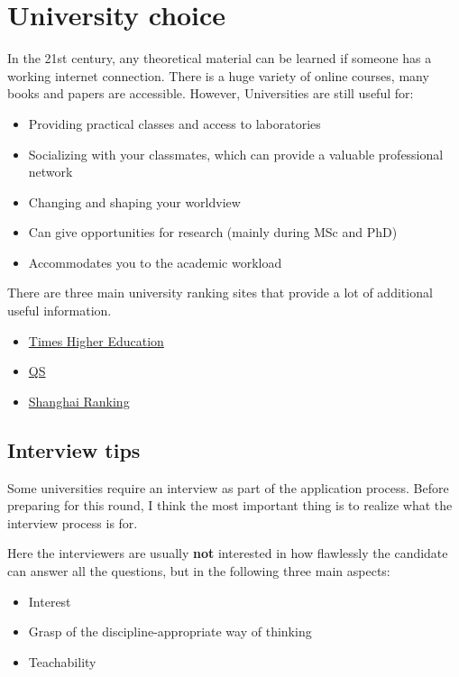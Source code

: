 \documentclass{article}
\begin{document}
\section{University choice}

In the 21st century, any theoretical material can be learned if someone has a working internet connection. There is a huge variety of online courses, many books and papers are accessible. However, Universities are still useful for:

\begin{itemize}
    \item Providing practical classes and access to laboratories
    \item Socializing with your classmates, which can provide a valuable professional network
    \item Changing and shaping your worldview
    \item Can give opportunities for research (mainly during MSc and PhD)
    \item Accommodates you to the academic workload
\end{itemize}

There are three main university ranking sites that provide a lot of additional useful information.
\begin{itemize}
\item \href{https://www.timeshighereducation.com/world-university-rankings}{Times Higher Education}
\item \href{https://www.topuniversities.com/world-university-rankings}{QS}
\item \href{http://www.shanghairanking.com/}{Shanghai Ranking}
\end{itemize}

\subsection{Interview tips}

Some universities require an interview as part of the application process. Before preparing for this round, I think the most important thing is to realize what the interview process is for.

Here the interviewers are usually {\bf not} interested in how flawlessly the candidate can answer all the questions, but in the following three main aspects:

\begin{itemize}
    \item Interest
    \item Grasp of the discipline-appropriate way of thinking
    \item Teachability
\end{itemize}
\end{document}
